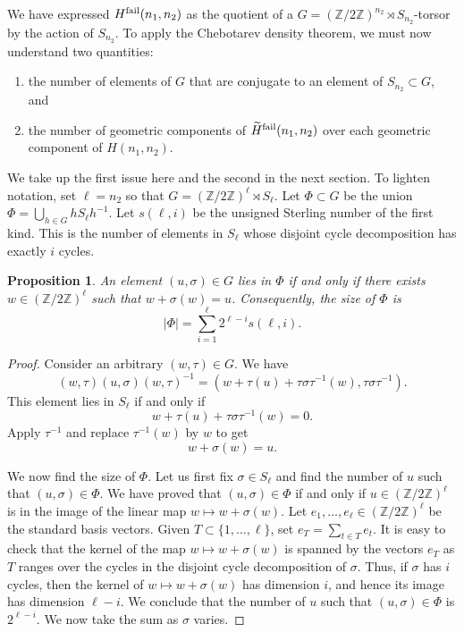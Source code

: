 \documentclass{amsart}
\numberwithin{equation}{section} \numberwithin{figure}{section}
\newcommand\ZZ{\mathbb{Z}}
\theoremstyle{one}
\newtheorem{proposition}[theorem]{\textbf{Proposition}}
\theoremstyle{definition}
\begin{document}
We have expressed \(H^{\rm fail}(n_1,n_2)\) as the quotient of a \(G = (\ZZ/2\ZZ)^{n_2} \rtimes S_{n_2}\)-torsor by the action of \(S_{n_2}\).
To apply the Chebotarev density theorem, we must now understand two quantities:
\begin{enumerate}
\item the number of elements of \(G\) that are conjugate to an element of \(S_{n_2} \subset G\), and
\item the number of geometric components of \(\widetilde{H}^{\rm fail}(n_{1},n_2)\) over each geometric component of \(H(n_1,n_2)\). 
  \end{enumerate}

  We take up the first issue here and the second in the next section.
  To lighten notation, set \(\ell = n_2\) so that \(G = (\ZZ/2\ZZ)^{\ell} \rtimes S_{\ell}\).
  Let \(\Phi \subset G\) be the union \(\Phi = \bigcup_{h \in G} h S_\ell h^{-1}\).
  Let \(s(\ell,i)\) be the unsigned Sterling number of the first kind.
  This is the number of elements in \(S_{\ell}\) whose disjoint cycle decomposition has exactly \(i\) cycles.
  \begin{proposition}\label{prop:sterling}
  An element \((u,\sigma) \in G\) lies in \(\Phi\) if and only if there exists \(w \in (\ZZ/2\ZZ)^\ell\) such that \(w + \sigma(w) = u\).
  Consequently, the size of \(\Phi\) is
  \[ |\Phi| = \sum_{i = 1}^\ell 2^{\ell-i} s(\ell,i).\]
\end{proposition}

\begin{proof}
  Consider an arbitrary \((w,\tau) \in G\).
  We have
  \[ (w, \tau) (u, \sigma) (w, \tau)^{-1} = (w + \tau(u)+ \tau\sigma\tau^{-1}(w), \tau\sigma\tau^{-1}). \]
  This element lies in \(S_\ell\) if and only if
  \[ w + \tau(u) + \tau\sigma\tau^{-1}(w) = 0.\]
  Apply \(\tau^{-1}\) and replace \(\tau^{-1}(w)\) by \(w\) to get
  \[ w + \sigma(w) = u.\]

  We now find the size of \(\Phi\).
  Let us first fix \(\sigma \in S_\ell\) and find the number of \(u\) such that \((u,\sigma) \in \Phi\).
  We have proved that \((u, \sigma) \in \Phi\) if and only if \(u \in (\ZZ/2\ZZ)^\ell\) is in the image of the linear map \(w \mapsto w + \sigma(w)\).
  Let \(e_1, \dots, e_\ell \in (\ZZ/2\ZZ)^\ell\) be the standard basis vectors.
  Given \(T \subset \{1, \dots, \ell\}\), set \(e_{T} = \sum_{t \in T}e_t\).
  It is easy to check that the kernel of the map \(w \mapsto w + \sigma(w)\) is spanned by the vectors \(e_{T}\) as \(T\) ranges over the cycles in the disjoint cycle decomposition of \(\sigma\).
  Thus, if \(\sigma\) has \(i\) cycles, then the kernel of \(w \mapsto w + \sigma(w)\) has dimension \(i\), and hence its image has dimension \(\ell-i\).
  We conclude that the number of \(u\) such that \((u,\sigma) \in \Phi\) is \(2^{\ell-i}\).
  We now take the sum as \(\sigma\) varies.
\end{proof}
\end{document}

